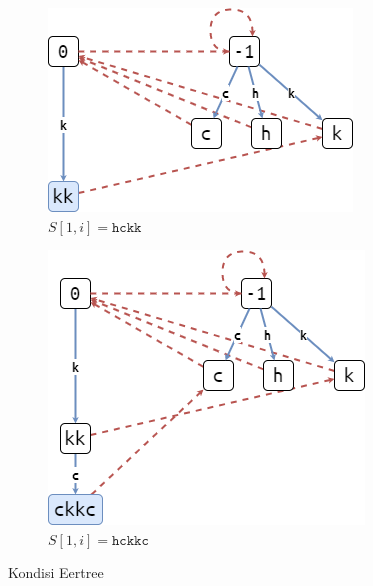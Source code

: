 \documentclass[11pt, a4paper, final]{article}
\begin{document}
\begin{figure}[H]
\centering
\begin{subfigure}[b]{0.45\textwidth}
\includegraphics[scale=0.45]{assets/eer04.png}
\caption{$S[1, i] = \texttt{hckk}$}
\end{subfigure}
\begin{subfigure}[b]{0.45\textwidth}
\includegraphics[scale=0.45]{assets/eer05.png}
\caption{$S[1, i] = \texttt{hckkc}$}
\end{subfigure}
\caption{Kondisi Eertree}
\end{figure}
\end{document}
